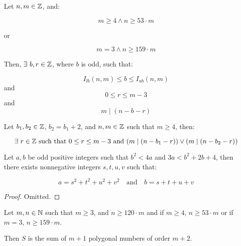 \begin{lemma}[b r]
    \label{lemma:b_r}
    \leanok
    Let $n,m\in\mathbb{Z}$, and:

    \[
        m\geq 4 \land n \geq 53 \cdot m
    \]

    or 

    \[
        m = 3 \land n \geq 159 \cdot m
    \]

    Then, $\exists\ b,r \in \mathbb{Z}$, where $b$ is odd, such that:

    \[
        I_{lb}(n,m) \leq b \leq I_{ub}(n,m)
    \]
    and
    \[
        0 \leq r \leq m - 3
    \]
    and
    \[
        m \mid (n - b - r)
    \]
\end{lemma}

\begin{lemma}[res b r]
    \label{lemma:res_b_r}
    \leanok

    Let $b_1,b_2\in\mathbb{Z}$, $b_2 = b_1 + 2$, and $n,m\in\mathbb{Z}$ such that $m \geq 4$, then:

    \[
        \exists\ r\in \mathbb{Z}\text{ such that } 0 \leq r \leq m - 3\text{ and } (m \mid (n - b_1 - r)) \lor (m \mid (n - b_2 - r))
    \]
\end{lemma}


\begin{lemma}
    \label{lem:CauchyLemma}
    \leanok

    Let $a,b$ be odd positive integers such that $b^2<4a$ and $3a<b^2+2b+4$, then there exists nonnegative integers $s,t,u,v$ such that:

    \[
        a=s^2+t^2+u^2+v^2 \quad \text{and} \quad b=s+t+u+v
    \]
\end{lemma}

\begin{proof}
    Omitted.
\end{proof}


%
%
\begin{theorem}
    \label{thm:CauchyPolygonalNumberTheorem}
    \leanok

    Let $m,n\in\mathbb{N}$ such that $m \geq 3$, and $n \geq 120\cdot m$ and if $m\geq 4$, $n \geq 53\cdot m$ or if $m = 3$, $n \geq 159\cdot m$. 
    
    Then $S$ is the sum of $m+1$ polygonal numbers of order $m + 2$.
\end{theorem}

